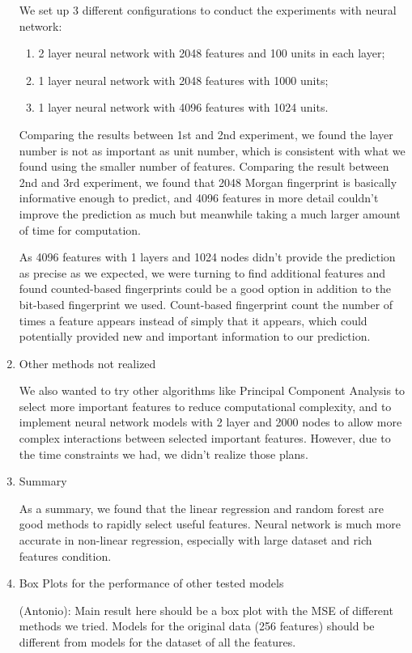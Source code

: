 \documentclass[11pt]{article}
\begin{document}
\begin{enumerate}
We set up 3 different configurations to conduct the experiments with neural network: 
\begin{enumerate}
\item 2 layer neural network with 2048 features and 100 units in each layer; 
\item 1 layer neural network with 2048 features with 1000 units; 
\item 1 layer neural network with 4096 features with 1024 units. 
\end{enumerate}
Comparing the results between 1st and 2nd experiment, we found the layer number is not as important as unit number, which is consistent with what we found using the smaller number of features. Comparing the result between 2nd and 3rd experiment, we found that 2048 Morgan fingerprint is basically informative enough to predict, and 4096 features in more detail couldn't improve the prediction as much but meanwhile taking a much larger amount of time for computation.

As 4096 features with 1 layers and 1024 nodes didn't provide the prediction as precise as we expected, we were turning to find additional features and found counted-based fingerprints could be a good option in addition to the bit-based fingerprint we used. Count-based fingerprint count the number of times a feature appears instead of simply that it appears, which could potentially provided new and important information to our prediction. \\

\item Other methods not realized

We also wanted to try other algorithms like Principal Component Analysis to select more important features to reduce computational complexity, and to implement neural network models with 2 layer and 2000 nodes to allow more complex interactions between selected important features. However, due to the time constraints we had, we didn't realize those plans. \\

\item Summary

As a summary, we found that the linear regression and random forest are good methods to rapidly select useful features. Neural network is much more accurate in non-linear regression, especially with large dataset and rich features condition. \\


\item Box Plots for the performance of other tested models

(Antonio): Main result here should be a box plot with the MSE of different methods we tried. Models for the original data (256 features) should be different from models for the dataset of all the features.
\end{enumerate}
\end{document}

